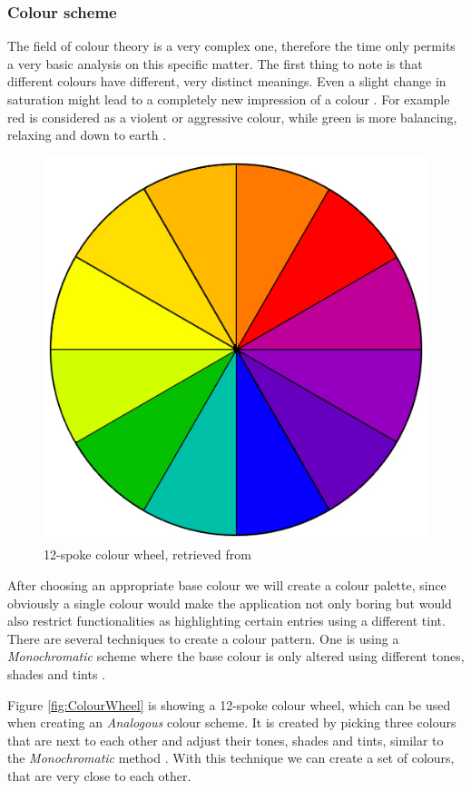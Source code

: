\subsubsection{Colour scheme}
\label{sec:ColourConcept}

The field of colour theory is a very complex one, therefore the time only permits a very basic analysis on this specific matter. The first thing to note is that different colours have different, very distinct meanings. Even a slight change in saturation might lead to a completely new impression of a colour \cite{Chapman:2010aa}. For example red is considered as a violent or aggressive colour, while green is more balancing, relaxing and down to earth \cite{Chapman:2010aa}.

\begin{figure}[h]
  	\centering
  	\includegraphics[width=0.5\linewidth]{./images/colorwheel.jpg}
  	\caption{12-spoke colour wheel, retrieved from \cite{Chapman:2010ab}}
	\label{fig:ColourWheel}
\end{figure}

After choosing an appropriate base colour we will create a colour palette, since obviously a single colour would make the application not only boring but would also restrict functionalities as highlighting certain entries using a different tint. There are several techniques to create a colour pattern. One is using a \emph{Monochromatic} scheme where the base colour is only altered using different tones, shades and tints \cite{Chapman:2010ab}. 


Figure \vref{fig:ColourWheel} is showing a 12-spoke colour wheel, which can be used when creating an \emph{Analogous} colour scheme. It is created by picking three colours that are next to each other and adjust their tones, shades and tints, similar to the \emph{Monochromatic} method \cite{Chapman:2010ab}. With this technique we can create a set of colours, that are very close to each other.

